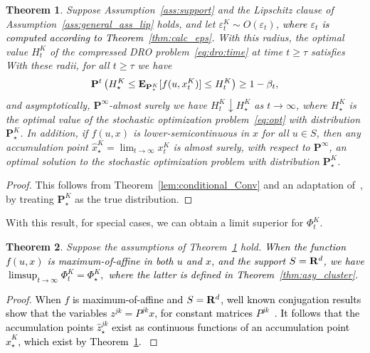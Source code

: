 \documentclass[12pt]{article}
\newcommand{\reals}{{\bf R}}
\newcommand{\prob}{{\mathbf P}}
\newcommand{\Expect}{{\mbox{\bf E}}}
\newcommand{\supp}{S}
\newcommand{\eps}{\varepsilon^K}
\newcommand{\epsnom}{\varepsilon}
\newtheorem{theorem}{Theorem}[section]  %
\newcommand{\RC}[1]{\textcolor{black}{#1}}
\newcommand{\RC}[1]{\textcolor{blue}{#1}}
\begin{document}
\begin{theorem}
\label{thm:converge_K}
Suppose Assumption~\ref{ass:support} and the Lipschitz clause of Assumption~\ref{ass:general_ass_lip} holds, and let $\eps_{t} \sim O(\epsnom_{t})$, \RC{where $\epsnom_{t}$ is computed according to Theorem~\ref{thm:calc_eps}.} 
\ifpreprint
With this radius, the optimal value $H^K_t$ of the compressed \gls{DRO} problem~\eqref{eq:dro:time} at time $t \geq \tau$ satisfies
\else With these radii, for all $t \geq \tau$ we have\fi
\begin{equation*}
	\prob^{{t}}\left( H^K_\star \leq \Expect_{\prob^K_\star}[f(u, x^K_{t})] \le H^K_t\right) \ge 1 - \beta_{t},
\end{equation*}
and asymptotically, $\prob^\infty$-almost surely we have $H^K_t \downarrow H^K_\star$ as $t\to\infty$, where $H^K_\star$ is the optimal value of the stochastic optimization problem~\eqref{eq:opt} with distribution $\prob^K_\star$.
In addition, if $f(u,x)$ is lower-semicontinuous in $x$ for all $u \in \supp$, then any accumulation point $\hat{x}^K_\star = \lim_{t\to \infty}x_t^K$ is almost surely, with respect to $\prob^\infty$, an optimal solution to the stochastic optimization problem with distribution $\prob^K_\star$.
\end{theorem}
\begin{proof}
This follows from Theorem~\ref{lem:conditional_Conv} and an adaptation of~\cite[Theorem 3.6]{mohajerin2018data}, by treating $\prob^K_\star$ as the true distribution.
\end{proof}

With this result, for special cases, we can obtain a limit superior for $\Phi^K_t$.
\begin{theorem}
    \label{thm:lim_phi}
Suppose the assumptions of Theorem~\ref{thm:converge_K} hold.
\RC{When the function $f(u,x)$ is maximum-of-affine in both $u$ and $x$, and the support $\supp = \reals^d$, we have
$\limsup_{t \to \infty} \Phi^K_{t} = \Phi^K_\star, $
where the latter is defined in Theorem~\ref{thm:asy_cluster}.}
\end{theorem}
\begin{proof}
\RC{When $f$ is maximum-of-affine and $\supp = \reals^d$, well known conjugation results show that the variables $z^{jk} = P^{jk}x$, for constant matrices $P^{jk}$~\cite[Corollary 5.1]{mohajerin2018data}. 
It follows that the accumulation points $\hat{z}^{jk}_\star$ exist as continuous functions of an accumulation point $\hat{x}^K_\star$, which exist by Theorem~\ref{thm:converge_K}.
}
\end{proof}
\end{document}
